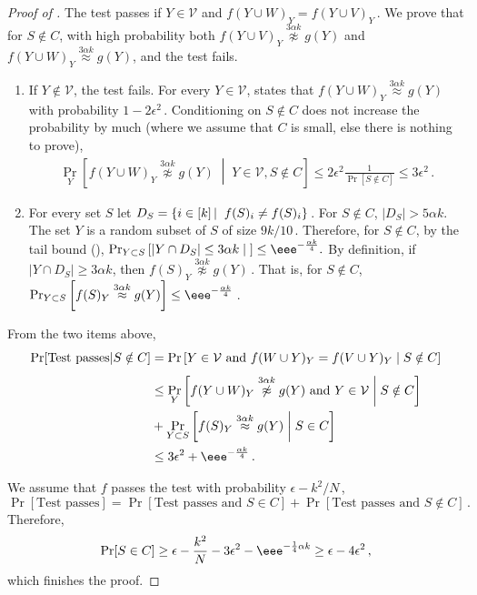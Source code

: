 \documentclass{toc}
\newcommand{\Prob}[2][]{\Pr_{{#1}}\left[#2\right]} %
\newcommand{\abs}[1]{\lvert#1\rvert} %
\newcommand{\given}{\;\middle\vert\;} %
\newcommand\sett[2]{\left\{ #1 \left| \; \vphantom{#1 #2} \right. #2  \right\}} %
\newcommand\f{f} %
\newcommand\setf{f} %
\newcommand{\g}{g} %
\newcommand\neql[1]{\stackrel{{#1}}{ \approx}} %
\newcommand\neqg[1]{\stackrel{{#1}}{ \not\approx}} %
\newcommand\cons{\mathcal{V}} %
\begin{document}
\begin{proof}[Proof of ]
	The test passes if $Y\in\cons$ and $\setf(Y\cup W)_Y= \setf(Y\cup V)_Y$\,. We prove that for $S\notin C$, with high probability both $\setf(Y\cup V)_Y \neqg{3\alpha k} \g(Y)$ and $\setf(Y\cup W)_Y\neql{3\alpha k} \g(Y)$, and the test fails.

    \begin{enumerate}
        \item \label{item:sets local}   
        If $Y\notin \cons$, the test fails. For every $Y\in\cons$,  states that $\setf(Y\cup W)_Y\neql{3\alpha k} \g(Y)$ with probability $1-2\epsilon^2$\,. Conditioning on $S\notin C$ does not increase the probability by much (where we assume that $C$ is small, else there is nothing to prove),
	\begin{align}\label{eq:set func eq product}
		\Prob[Y]{\setf(Y\cup W)_Y\neqg{3\alpha k} \g(Y)\given Y\in \cons,S\notin C}\leq 2\epsilon^2\frac{1}{\Pr[S\notin C]} \leq 3\epsilon^2\,. %
	\end{align}
      \item 	For every set $S$ let $D_S = \sett{i\in[k]}{\f(S)_i\neq \setf(S)_i}$\,. For $S\notin C$, $\abs{D_S} > 5\alpha k$. The set $Y$ is a random subset of $S$ of size $9k/10$\,. Therefore, for $S\notin C$, by
%
the  %
%
tail bound (), $\Prob[Y\subset S]{\abs{Y\cap D_S}\leq {3\alpha k} \given}\leq   \eee^{-\frac{\alpha k}{4}}.$ By definition, if $\abs{Y\cap D_S}\geq {3\alpha k}$, then $\setf(S)_Y \neqg{3\alpha k} \g(Y)$\,. That is, for $S\notin C$, $\Prob[Y\subset S]{\setf(S)_Y \neql{3\alpha k} \g(Y)} \leq \eee^{-\frac{\alpha k}{4}}$\,.
    \end{enumerate}
 
	
    From the two items above, 
	\begin{align*}
	    \Pr[\text{Test passes}| S\notin C]
	    &= \Prob{Y\in\cons \textrm{ and } \f(W\cup Y)_Y = \f(V\cup Y)_Y \given S\notin C}\\
	    &\leq \Prob[Y]{\setf(Y\cup W)_Y\neqg{3\alpha k} \g(Y) \textrm{ and } Y\in \cons \given S\notin C} \\
	    &+ \Prob[Y\subset S]{\setf(S)_Y \neql{3\alpha k} \g(Y) \given S\in C} 
	    \\ &\leq 3\epsilon^2 + \eee^{-\frac{\alpha k}{4}}\,.
	\end{align*}
	
	We assume that $\f$ passes the test with probability $\epsilon -
	k^2/N$\,, %
	\[ \Pr[\text{Test passes}] = \Pr[\text{Test passes and } S\in C] + \Pr[\text{Test passes and } S\notin C]\,. \]%
	Therefore,
	\[ \Pr[S\in C]\geq \epsilon -\frac{k^2}{N} - 3\epsilon^2 - \eee^{-\frac{1}{4}\alpha k} \geq \epsilon - 4\epsilon^2\,, \] %
	which finishes the proof.
\end{proof}
\end{document}
